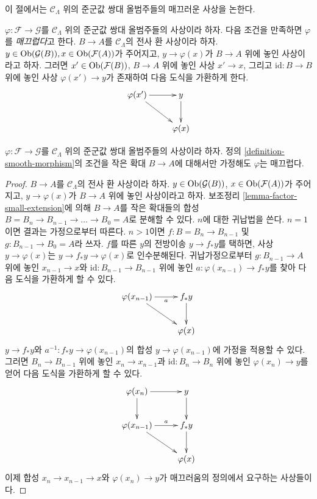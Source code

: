 \noindent
이 절에서는 $\mathcal{C}_\Lambda$ 위의 준군값 쌍대 올범주들의
매끄러운 사상을 논한다.

\begin{definition}
\label{definition-smooth-morphism}
$\varphi : \mathcal{F} \to \mathcal{G}$를 $\mathcal{C}_\Lambda$ 위의
준군값 쌍대 올범주들의 사상이라 하자. 다음 조건을 만족하면
$\varphi$를 {\it 매끄럽다}고 한다. $B \to A$를
$\mathcal{C}_\Lambda$의 전사 환 사상이라 하자.
$y \in \mathop{\mathrm{Ob}}\nolimits(\mathcal{G}(B)), x \in \mathop{\mathrm{Ob}}\nolimits(\mathcal{F}(A))$가 주어지고,
$y \to \varphi(x)$가 $B \to A$ 위에 놓인 사상이라고 하자. 그러면
$x' \in \mathop{\mathrm{Ob}}\nolimits(\mathcal{F}(B))$, $B \to A$ 위에 놓인 사상
$x' \to x$, 그리고 $\text{id}: B \to B$ 위에 놓인 사상
$\varphi(x') \to y$가 존재하여 다음 도식을 가환하게 한다.
$$
\xymatrix{
\varphi(x') \ar[r] \ar[dr] & y \ar[d] \\
& \varphi(x)
}
$$
\end{definition}

\begin{lemma}
\label{lemma-smoothness-small-extensions}
$\varphi : \mathcal{F} \to \mathcal{G}$를 $\mathcal{C}_\Lambda$ 위의
준군값 쌍대 올범주들의 사상이라 하자. 정의
\ref{definition-smooth-morphism}의 조건을 작은 확대
$B \to A$에 대해서만 가정해도 $\varphi$는 매끄럽다.
\end{lemma}

\begin{proof}
$B \to A$를 $\mathcal{C}_\Lambda$의 전사 환 사상이라 하자.
$y \in \mathop{\mathrm{Ob}}\nolimits(\mathcal{G}(B))$, $x \in \mathop{\mathrm{Ob}}\nolimits(\mathcal{F}(A))$가 주어지고,
$y \to \varphi(x)$가 $B \to A$ 위에 놓인 사상이라고 하자. 보조정리
\ref{lemma-factor-small-extension}에 의해 $B \to A$를 작은 확대들의 합성
$B = B_n \to B_{n-1} \to \ldots \to B_0 = A$로 분해할 수 있다.
$n$에 대한 귀납법을 쓴다. $n = 1$이면 결과는 가정으로부터 따른다.
$n > 1$이면 $f : B = B_n \to B_{n - 1}$ 및
$g : B_{n - 1} \to B_0 = A$라 쓰자. $f$를 따른 $y$의 전방이송
$y \to f_* y$를 택하면, 사상 $y \to \varphi(x)$는
$y \to f_* y \to \varphi(x)$로 인수분해된다. 귀납가정으로부터
$g : B_{n - 1} \to A$ 위에 놓인 $x_{n - 1} \to x$와
$\text{id} : B_{n - 1} \to B_{n - 1}$ 위에 놓인
$a : \varphi(x_{n - 1}) \to f_*y$를 찾아 다음 도식을 가환하게 할 수 있다.
$$
\xymatrix{
\varphi(x_{n - 1}) \ar[r]_-a \ar[dr] & f_*y \ar[d] \\
& \varphi(x)
}
$$
$y \to f_*y$와 $a^{-1} : f_*y \to \varphi(x_{n - 1})$의 합성
$y \to \varphi(x_{n - 1})$에 가정을 적용할 수 있다. 그러면
$B_n \to B_{n - 1}$ 위에 놓인 $x_n \to x_{n - 1}$과
$\text{id} : B_n \to B_n$ 위에 놓인 $\varphi(x_n) \to y$를 얻어
다음 도식을 가환하게 할 수 있다.
$$
\xymatrix{
\varphi(x_n) \ar[r] \ar[d] & y \ar[d] \\
\varphi(x_{n - 1}) \ar[r]^-a \ar[dr] & f_*y \ar[d] \\
& \varphi(x)
}
$$
이제 합성 $x_n \to x_{n - 1} \to x$와 $\varphi(x_n) \to y$가
매끄러움의 정의에서 요구하는 사상들이다.
\end{proof}

